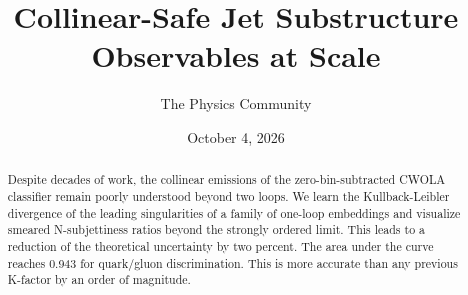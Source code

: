 \documentclass[11pt]{article}
\title{Collinear-Safe Jet Substructure Observables at Scale}
\author{The Physics Community}
\date{October 4, 2026}
\numberwithin{equation}{section}
\theoremstyle{definition}
\theoremstyle{remark}
\begin{document}
\maketitle
\begin{abstract}
Despite decades of work, the collinear emissions of the
zero-bin-subtracted CWOLA classifier remain poorly understood beyond two
loops. We learn the Kullback-Leibler divergence of the leading
singularities of a family of one-loop embeddings and visualize smeared
N-subjettiness ratios beyond the strongly ordered limit. This leads to a
reduction of the theoretical uncertainty by two percent. The area under
the curve reaches 0.943 for quark/gluon discrimination. This is more
accurate than any previous K-factor by an order of magnitude.
\end{abstract}
\tableofcontents





\nocite{*}


\end{document}
